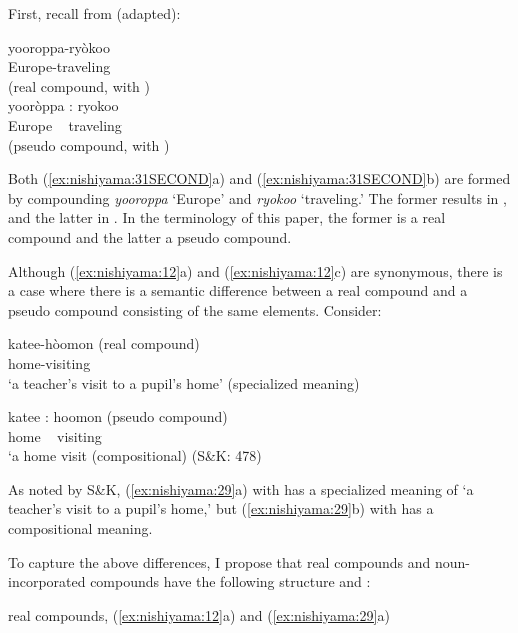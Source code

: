 \documentclass[output=paper]{LSP/langsci}
\begin{document}
First, recall from  (adapted):

\ea\label{ex:nishiyama:31SECOND}
          \ea  
          \gll yooroppa-ryòkoo    \\
    Europe-traveling\\
\glt (real compound, with ) \\
  \ex
  \gll yooròppa : ryokoo    \\
      Europe ~  traveling\\
\glt (pseudo compound, with )\\
    \z \z

Both (\ref{ex:nishiyama:31SECOND}a) and (\ref{ex:nishiyama:31SECOND}b) are formed by compounding \textit{yooroppa} ‘Europe’ and \textit{ryokoo} ‘traveling.’ The former results in , and the latter in . In the terminology of this paper, the former is a real compound and the latter a pseudo compound.

Although (\ref{ex:nishiyama:12}a) and (\ref{ex:nishiyama:12}c) are synonymous, there is a case where there is a semantic difference between a real compound and a pseudo compound consisting of the same elements. Consider:

\ea\label{ex:nishiyama:29}
 \ea  
 \gll katee-hòomon (real compound)\\
    home-visiting\\
\glt ‘a teacher’s visit to a pupil’s home’ (specialized meaning)

  \ex  
  \gll katee : hoomon (pseudo compound)\\
    home ~ visiting\\
\glt ‘a home visit (compositional)              (S\&K: 478)
\z \z

As noted by S\&K, (\ref{ex:nishiyama:29}a) with  has a specialized meaning of ‘a teacher’s visit to a pupil’s home,’ but (\ref{ex:nishiyama:29}b) with  has a compositional meaning.

To capture the above differences, I propose that real compounds and noun-incorporated compounds have the following structure and :
 
\ea\label{ex:nishiyama:30}
 \ea  real compounds, (\ref{ex:nishiyama:12}a) and (\ref{ex:nishiyama:29}a)
\end{document}
